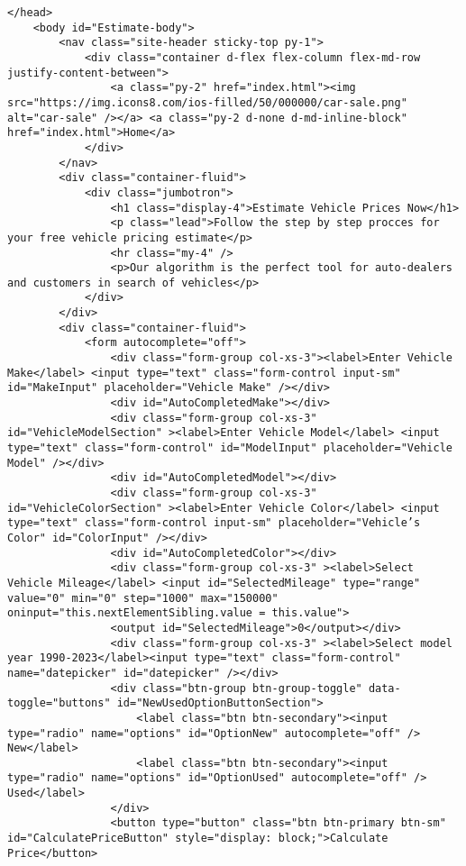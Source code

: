 \begin{lstlisting}[style=htmlcssjs]
    </head>
    <body id="Estimate-body">
        <nav class="site-header sticky-top py-1">
            <div class="container d-flex flex-column flex-md-row justify-content-between">
                <a class="py-2" href="index.html"><img src="https://img.icons8.com/ios-filled/50/000000/car-sale.png" alt="car-sale" /></a> <a class="py-2 d-none d-md-inline-block" href="index.html">Home</a>
            </div>
        </nav>
        <div class="container-fluid">
            <div class="jumbotron">
                <h1 class="display-4">Estimate Vehicle Prices Now</h1>
                <p class="lead">Follow the step by step procces for your free vehicle pricing estimate</p>
                <hr class="my-4" />
                <p>Our algorithm is the perfect tool for auto-dealers and customers in search of vehicles</p>
            </div>
        </div>
        <div class="container-fluid">
            <form autocomplete="off">
                <div class="form-group col-xs-3"><label>Enter Vehicle Make</label> <input type="text" class="form-control input-sm" id="MakeInput" placeholder="Vehicle Make" /></div>
                <div id="AutoCompletedMake"></div>
                <div class="form-group col-xs-3" id="VehicleModelSection" ><label>Enter Vehicle Model</label> <input type="text" class="form-control" id="ModelInput" placeholder="Vehicle Model" /></div>
                <div id="AutoCompletedModel"></div>
                <div class="form-group col-xs-3" id="VehicleColorSection" ><label>Enter Vehicle Color</label> <input type="text" class="form-control input-sm" placeholder="Vehicle’s Color" id="ColorInput" /></div>
                <div id="AutoCompletedColor"></div>
                <div class="form-group col-xs-3" ><label>Select Vehicle Mileage</label> <input id="SelectedMileage" type="range" value="0" min="0" step="1000" max="150000" oninput="this.nextElementSibling.value = this.value">
                <output id="SelectedMileage">0</output></div>
                <div class="form-group col-xs-3" ><label>Select model year 1990-2023</label><input type="text" class="form-control" name="datepicker" id="datepicker" /></div>   
                <div class="btn-group btn-group-toggle" data-toggle="buttons" id="NewUsedOptionButtonSection">
                    <label class="btn btn-secondary"><input type="radio" name="options" id="OptionNew" autocomplete="off" /> New</label>
                    <label class="btn btn-secondary"><input type="radio" name="options" id="OptionUsed" autocomplete="off" /> Used</label>
                </div>
                <button type="button" class="btn btn-primary btn-sm" id="CalculatePriceButton" style="display: block;">Calculate Price</button>

\end{lstlisting}
